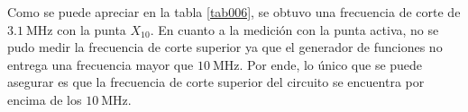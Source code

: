 \documentclass[a4paper,10pt]{article}
\begin{document}
				Como se puede apreciar en la tabla \ref{tab006}, se obtuvo una frecuencia de corte de $3.1~\text{MHz}$ con la punta $X_10$. En cuanto a la medición 
				con la punta activa, no se pudo medir la frecuencia de corte superior ya que el generador de funciones no entrega una frecuencia mayor que 
				$10~\text{MHz}$. Por ende, lo único que se puede asegurar es que la frecuencia de corte superior del circuito se encuentra por encima de los 
				$10~\text{MHz}$. 
		
\end{document}
